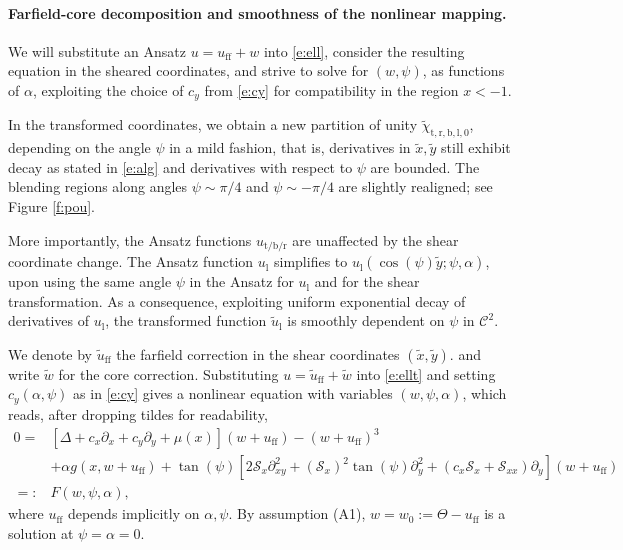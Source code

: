 \documentclass[10pt]{article}
\begin{document}



\paragraph{Farfield-core decomposition and smoothness of the nonlinear mapping.}

We will substitute an Ansatz $u={u}_\mathrm{ff}+w$ into \eqref{e:ell}, consider the resulting equation in the sheared coordinates,  and strive to solve for $(w,\psi)$, as functions of $\alpha$, exploiting the choice of $c_y$ from \eqref{e:cy} for compatibility in the region $x<-1$. 

In the transformed coordinates, we obtain a new partition of unity $\tilde{\chi}_\mathrm{t,r,b,l,0}$, depending on the angle $\psi$ in a mild fashion, that is, derivatives in $\tilde{x},\tilde{y}$ still exhibit decay as stated in \eqref{e:alg} and derivatives with respect to $\psi$ are bounded. The blending regions along angles $\psi\sim \pi/4$ and $\psi\sim -\pi/4$  are slightly realigned; see Figure \ref{f:pou}.

More importantly, the Ansatz functions $u_\mathrm{t/b/r}$ are unaffected by the shear coordinate change. The Ansatz function $u_\mathrm{l}$ simplifies to $u_\mathrm{l}(\cos(\psi)\tilde{y};\psi,\alpha)$, upon using the same angle $\psi$ in the Ansatz for $u_\mathrm{l}$ and for the shear transformation. As a consequence, exploiting uniform exponential decay of derivatives of $u_\mathrm{l}$, the transformed function  $\tilde{u}_\mathrm{l}$ is smoothly dependent on $\psi$ in $\mathcal{C}^2$. 

We denote by $\tilde{u}_\mathrm{ff}$ the farfield correction in the shear coordinates $(\tilde{x},\tilde{y})$. and write $\tilde{w}$ for the core correction. Substituting $u=\tilde{u}_\mathrm{ff}+\tilde{w}$ into \eqref{e:ellt} and setting $c_y(\alpha,\psi)$ as in \eqref{e:cy} gives a nonlinear equation with variables $(w,\psi,\alpha)$, which reads, after dropping tildes for readability,
\begin{align}\label{e:ellta}
0=&\left[\Delta + c_x \partial_{x} + c_y \partial_{y} + \mu(x)\right]({w}+{u}_\mathrm{ff}) - ({w}+{u}_\mathrm{ff})^3  \nonumber\\
&+ \alpha  g(x,{w}+{u}_\mathrm{ff}) + \tan(\psi)\left[ 2 \mathcal{S}_x \partial_{xy}^2 + (\mathcal{S}_{x})^2\tan(\psi)\partial_{y}^2 +  (c_x \mathcal{S}_x + \mathcal{S}_{xx})\partial_{y}\right]({w}+{u}_\mathrm{ff})\nonumber \\
=:&F(w,\psi,\alpha),
\end{align}
where $u_\mathrm{ff}$ depends implicitly on $\alpha,\psi$. By assumption (A1), 
$w=w_0:=\Theta-u_\mathrm{ff}$ is a solution at $\psi=\alpha=0$. 
\end{document}
